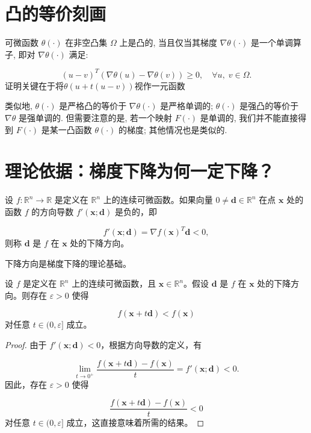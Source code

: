 \section{凸的等价刻画}
\begin{shaded}
可微函数 $\theta(\cdot)$ 在非空凸集 $\Omega$ 上是凸的, 当且仅当其梯度 $\nabla\theta(\cdot)$ 是一个单调算子, 即对 $\nabla\theta(\cdot)$ 满足:

$$
(u-v)^T(\nabla\theta(u)-\nabla\theta(v)) \geq 0, \quad \forall u,\; v \in \Omega.
$$ 
\alert{证明关键在于将$\theta(u+t(u-v))$视作一元函数}

类似地, $\theta(\cdot)$ 是严格凸的等价于 $\nabla\theta(\cdot)$ 是严格单调的; $\theta(\cdot)$ 是强凸的等价于 $\nabla\theta$ 是强单调的. 但需要注意的是, 若一个映射 $F(\cdot)$ 是单调的, 我们并不能直接得到 $F(\cdot)$ 是某一凸函数 $\theta(\cdot)$ 的梯度; 其他情况也是类似的.
\end{shaded}
\newpage
\section{理论依据：梯度下降为何一定下降？}
\begin{definition}[下降方向]
设 $f: \mathbb{R}^n \rightarrow \mathbb{R}$ 是定义在 $\mathbb{R}^n$ 上的连续可微函数。如果向量 $0 \neq \mathbf{d} \in \mathbb{R}^n$ 在点 $\mathbf{x}$ 处的函数 $f$ 的方向导数 $f'(\mathbf{x}; \mathbf{d})$ 是负的，即

$$
f'(\mathbf{x}; \mathbf{d}) = \nabla f(\mathbf{x})^T \mathbf{d} < 0,
$$ 
则称 $\mathbf{d}$ 是 $f$ 在 $\mathbf{x}$ 处的下降方向。
\begin{myalert}
下降方向是梯度下降的理论基础。
\end{myalert}
\end{definition}
\begin{shaded}
\begin{lemma}[下降方向的下降性质]
设 $f$ 是定义在 $\mathbb{R}^n$ 上的连续可微函数，且 $\mathbf{x} \in \mathbb{R}^n$。假设 $\mathbf{d}$ 是 $f$ 在 $\mathbf{x}$ 处的下降方向。则存在 $\varepsilon > 0$ 使得

$$
f(\mathbf{x} + t\mathbf{d}) < f(\mathbf{x})
$$ 
对任意 $t \in (0, \varepsilon]$ 成立。
\end{lemma}
\begin{proof}
由于 $f'(\mathbf{x}; \mathbf{d}) < 0$，根据方向导数的定义，有

$$
\lim_{t \to 0^+} \frac{f(\mathbf{x} + t\mathbf{d}) - f(\mathbf{x})}{t} = f'(\mathbf{x}; \mathbf{d}) < 0.
$$ 
因此，存在 $\varepsilon > 0$ 使得

$$
\frac{f(\mathbf{x} + t\mathbf{d}) - f(\mathbf{x})}{t} < 0
$$ 
对任意 $t \in (0, \varepsilon]$ 成立，这直接意味着所需的结果。
\end{proof}
\end{shaded}
\newpage
